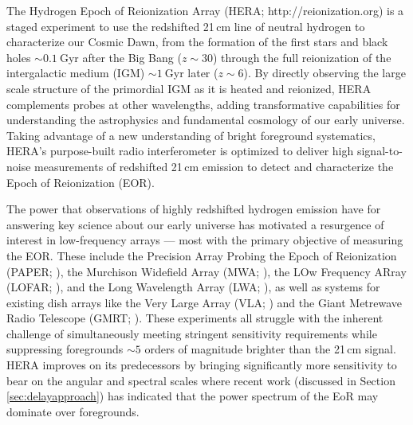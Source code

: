 \documentclass[preprint,11pt]{aastex}
\begin{document}
The Hydrogen Epoch of Reionization Array (HERA; http://reionization.org) is a staged experiment to use the redshifted 21\,cm line
of neutral hydrogen to characterize our Cosmic Dawn, from
the formation of the first stars and black holes $\sim0.1~$Gyr after the Big
Bang ($z\sim30$) through the full reionization of the intergalactic medium
(IGM) $\sim1~$Gyr later ($z\sim6$).  By directly observing the large scale
structure of the primordial IGM as it is heated and reionized, HERA complements
probes at other wavelengths, adding transformative capabilities for
understanding the astrophysics and fundamental cosmology of our early universe.
Taking advantage of a new understanding of bright foreground systematics, HERA's
purpose-built radio
interferometer is optimized to deliver high signal-to-noise measurements of
redshifted 21\,cm emission to detect and characterize the Epoch of Reionization (EOR).

The power that observations of highly redshifted hydrogen emission have for answering key science about our early universe
has motivated a resurgence of interest in low-frequency arrays --- most with the primary
objective of measuring the EOR.  These include the Precision Array Probing the Epoch of Reionization (PAPER; \citealt{parsons_et_al2010}), the Murchison Widefield Array (MWA; \citealt{tingay_et_al2013}), the LOw Frequency ARray (LOFAR; \citealt{2013A&A...556A...2V}), and the Long Wavelength Array (LWA; \citealt{2009IEEEP..97.1421E}), as well as systems for existing dish arrays like the Very Large Array (VLA; \citealt{2013AAS...22132804K}) and the Giant Metrewave Radio Telescope (GMRT; \citealt{paciga_et_al2011}).
These experiments all struggle with the
inherent challenge of simultaneously meeting stringent sensitivity requirements
while suppressing foregrounds $\sim5$ orders of magnitude
brighter than the 21\,cm signal.
HERA improves on its predecessors by bringing significantly more sensitivity to bear
on the angular and spectral scales where recent work (discussed in Section \ref{sec:delayapproach}) has indicated that
the power spectrum of the EoR may dominate over foregrounds.
\end{document}
